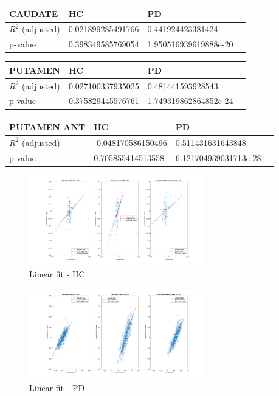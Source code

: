 \documentclass[]{article}
\begin{document}
\begin{tabular}{|l|l|l|r|}
	\hline
	CAUDATE & HC & PD \\
	\hline
	$R^2$ (adjusted) & 0.021899285491766 & 0.441924423381424 \\ 
	\hline
	p-value & 0.398349585769054 & 1.950516939619888e-20 \\
	\hline
\end{tabular}
\newline
\begin{tabular}{|l|l|l|r|}
	\hline
	PUTAMEN & HC & PD \\
	\hline
	$R^2$ (adjusted) & 0.027100337935025 & 0.481441593928543 \\ 
	\hline
	p-value & 0.375829445576761 & 1.749319862864852e-24 \\
	\hline
\end{tabular}
\newline
\begin{tabular}{|l|l|l|r|}
	\hline
	PUTAMEN ANT & HC & PD \\
	\hline
	$R^2$ (adjusted) &  -0.048170586150496 & 0.511431631643848 \\ 
	\hline
	p-value & 0.705855414513558 & 6.121704939031713e-28 \\
	\hline
\end{tabular}

\begin{figure}[h]
\centering
\includegraphics[width=3in]{../fit_covariates_hc}
\caption{Linear fit - HC}
\label{fig:lin_fit_hc}
\end{figure} 

\begin{figure}[h]
\centering
\includegraphics[width=3in]{../fit_covariates_pd}
\caption{Linear fit - PD}
\label{fig:lin_fit_pd}
\end{figure} 
\end{document}
